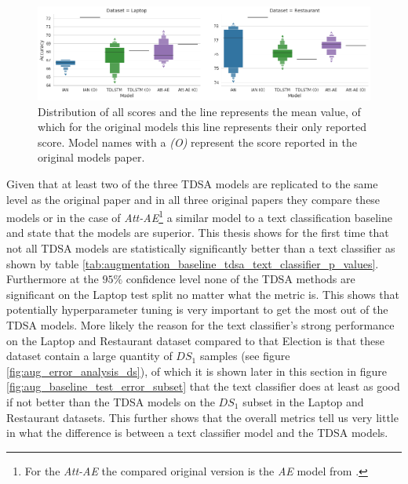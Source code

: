 \begin{figure}[ht!]
    \centering
    \includegraphics[scale=0.32]{images/augmentation/methods_performance/baseline/replication_experiment_baseline.png}
    \caption{Distribution of all scores and the line represents the mean value, of which for the original models this line represents their only reported score. Model names with a \textit{(O)} represent the score reported in the original models paper.}
    \label{fig:aug_baseline_replication_scores}
\end{figure}

Given that at least two of the three TDSA models are replicated to the same level as the original paper and in all three original papers they compare these models or in the case of \textit{Att-AE}\footnote{For the \textit{Att-AE} the compared original version is the \textit{AE} model from \citet{wang-etal-2016-attention}.} a similar model to a text classification baseline and state that the models are superior. This thesis shows for the first time that not all TDSA models are statistically significantly better than a text classifier as shown by table \ref{tab:augmentation_baseline_tdsa_text_classifier_p_values}. Furthermore at the $95\%$ confidence level none of the TDSA methods are significant on the Laptop test split no matter what the metric is. This shows that potentially hyperparameter tuning is very important to get the most out of the TDSA models. More likely the reason for the text classifier's strong performance on the Laptop and Restaurant dataset compared to that Election is that these dataset contain a large quantity of $DS_1$ samples (see figure \ref{fig:aug_error_analysis_ds}), of which it is shown later in this section in figure \ref{fig:aug_baseline_test_error_subset} that the text classifier does at least as good if not better than the TDSA models on the $DS_1$ subset in the Laptop and Restaurant datasets. This further shows that the overall metrics tell us very little in what the difference is between a text classifier model and the TDSA models.  



